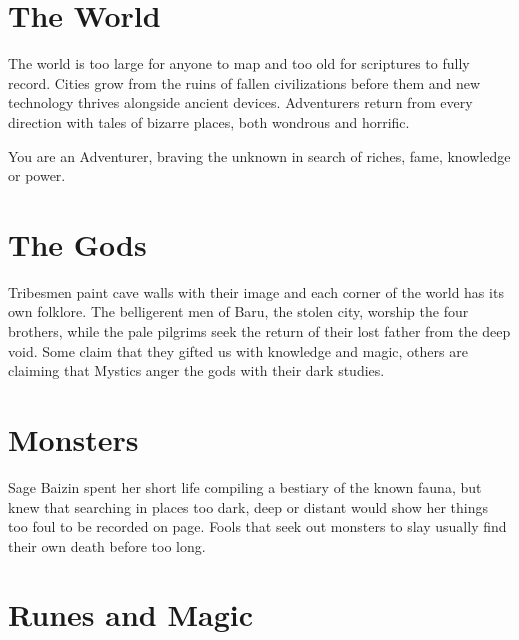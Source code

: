 \documentclass[itdr]{subfiles}
\begin{document}
\begin{minipage}{\textwidth}
\toc[2] %
\end{minipage}

\vfill


\clearpage


\section*{The World}

The world is too large for anyone to map and too old for scriptures to fully record. Cities grow from the ruins of fallen civilizations before them and new technology thrives alongside ancient devices. Adventurers return from every direction with tales of bizarre places, both wondrous and horrific.

You are an Adventurer, braving the unknown in search of riches, fame, knowledge or power.

\section*{The Gods}

Tribesmen paint cave walls with their image and each corner of the world has its own folklore. The belligerent men of Baru, the stolen city, worship the four brothers, while the pale pilgrims seek the return of their lost father from the deep void. Some claim that they gifted us with knowledge and magic, others are claiming that Mystics anger the gods with their dark studies.

\section*{Monsters}

Sage Baizin spent her short life compiling a bestiary of the known fauna, but knew that searching in places too dark, deep or distant would show her things too foul to be recorded on page. Fools that seek out monsters to slay usually find their own death before too long.

\section*{Runes and Magic}
\end{document}
